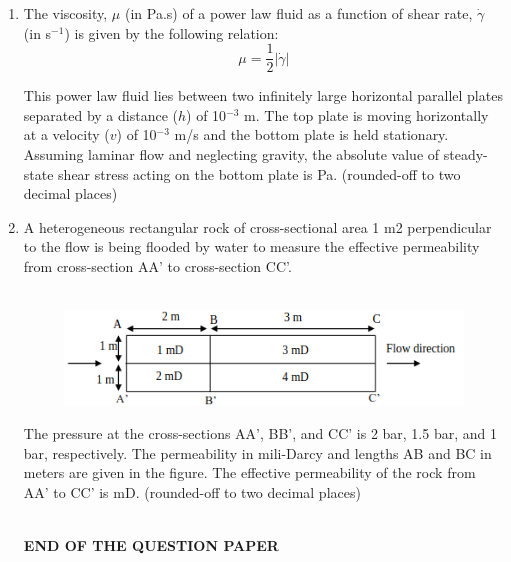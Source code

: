 \documentclass[12pt,a4paper]{article}
\begin{document}
\begin{enumerate}
\item The viscosity, $\mu$ (in Pa.s) of a power law fluid as a function of shear rate, $\dot{\gamma}$ (in s$^{-1}$) is given by the following relation: 
\[ \mu = \frac{1}{2} |\dot{\gamma}| \]

This power law fluid lies between two infinitely large horizontal parallel plates separated by a distance ($h$) of 10$^{-3}$ m. The top plate is moving horizontally at a velocity ($v$) of 10$^{-3}$ m/s and the bottom plate is held stationary. Assuming laminar flow and neglecting gravity, the absolute value of steady-state shear stress acting on the bottom plate is \underline{\hspace{2cm}} Pa. (rounded-off to two decimal places) \hfill{}

\pagebreak

\item A heterogeneous rectangular rock of cross-sectional area 1 m2 perpendicular to the flow is
being flooded by water to measure the effective permeability from cross-section AA’ to
cross-section CC’.\hfill{}\\\\

\begin{figure}[h!]
  \centering
  \includegraphics[width=0.8\columnwidth]{figs/pic12.png} 
\end{figure}

The pressure at the cross-sections AA’, BB’, and CC’ is 2 bar, 1.5 bar, and 1 bar,
respectively. The permeability in mili-Darcy and lengths AB and BC in meters are given in
the figure. The effective permeability of the rock from AA’ to CC’ is \underline{\hspace{4cm}}mD. 
(rounded-off to two decimal places)\\\\
\vspace{6cm}
\begin{center}
	{\LARGE \textbf{END OF THE QUESTION PAPER}}
\end{center}


\end{enumerate}
\end{document}
